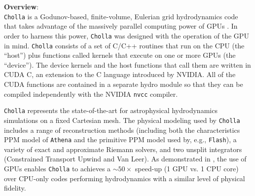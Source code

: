 \documentclass[11pt,letterpaper,english]{article}
\begin{document}
{\bf Overview}:\\
{\tt Cholla} is a Godunov\cite{Godunov59}-based, finite-volume, Eulerian grid 
hydrodynamics code that takes advantage of the massively parallel computing power of GPUs \cite{Schneider15}. 
In order to harness this power, {\tt Cholla} was designed with the operation of the GPU in mind. 
{\tt Cholla} consists of a set of C/C++ routines that run on the CPU 
(the ``host'') plus functions called kernels that execute on one or
more GPUs (the ``device''). The device kernels and the host functions that call them are written in CUDA C, an extension to the C language introduced by NVIDIA. All of the CUDA functions are contained in a separate hydro module so that they can be compiled independently with the NVIDIA {\tt nvcc} compiler. %

{\tt Cholla} represents the state-of-the-art for astrophysical hydrodynamics
simulations
on a fixed Cartesian mesh. The physical modeling used by {\tt Cholla} 
includes a range of reconstruction methods (including both the characteristics PPM model of {\tt Athena} and the primitive PPM model used
by, e.g., {\tt Flash}), a variety of exact and approximate Riemann solvers,
and two unsplit integrators (Constrained Transport Upwind and Van Leer).
As demonstrated in \cite{Schneider15}, the use of GPUs enables
{\tt Cholla} to achieves a $\sim50\times$ speed-up (1 GPU vs. 1 CPU core)
over CPU-only codes performing hydrodynamics with a similar level of physical fidelity.
\end{document}
